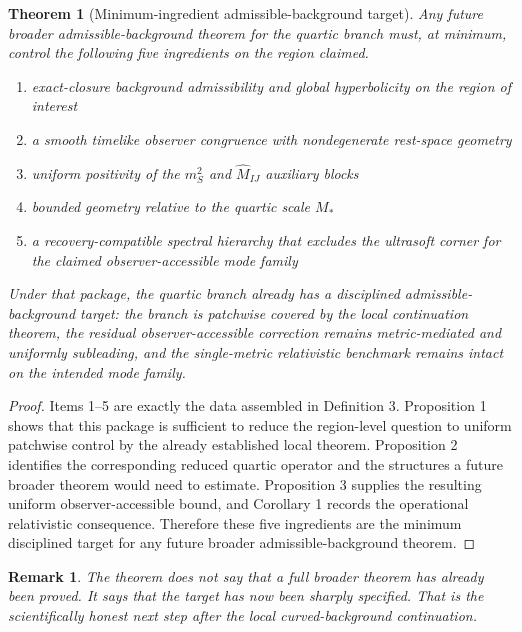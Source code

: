 \documentclass[11pt]{article}
\newtheorem{remark}{Remark}
\newtheorem{theorem}{Theorem}
\begin{document}
\begin{theorem}[Minimum-ingredient admissible-background target]
Any future broader admissible-background theorem for the quartic branch must, at minimum, control the following five ingredients on the region claimed.
\begin{enumerate}
    \item exact-closure background admissibility and global hyperbolicity on the region of interest
    \item a smooth timelike observer congruence with nondegenerate rest-space geometry
    \item uniform positivity of the \(m_S^2\) and \(\widehat M_{IJ}\) auxiliary blocks
    \item bounded geometry relative to the quartic scale \(M_*\)
    \item a recovery-compatible spectral hierarchy that excludes the ultrasoft corner for the claimed observer-accessible mode family
\end{enumerate}
Under that package, the quartic branch already has a disciplined admissible-background target: the branch is patchwise covered by the local continuation theorem, the residual observer-accessible correction remains metric-mediated and uniformly subleading, and the single-metric relativistic benchmark remains intact on the intended mode family.
\end{theorem}

\begin{proof}
Items 1--5 are exactly the data assembled in Definition 3. Proposition 1 shows that this package is sufficient to reduce the region-level question to uniform patchwise control by the already established local theorem. Proposition 2 identifies the corresponding reduced quartic operator and the structures a future broader theorem would need to estimate. Proposition 3 supplies the resulting uniform observer-accessible bound, and Corollary 1 records the operational relativistic consequence. Therefore these five ingredients are the minimum disciplined target for any future broader admissible-background theorem.
\end{proof}

\begin{remark}
The theorem does not say that a full broader theorem has already been proved. It says that the target has now been sharply specified. That is the scientifically honest next step after the local curved-background continuation.
\end{remark}
\end{document}
